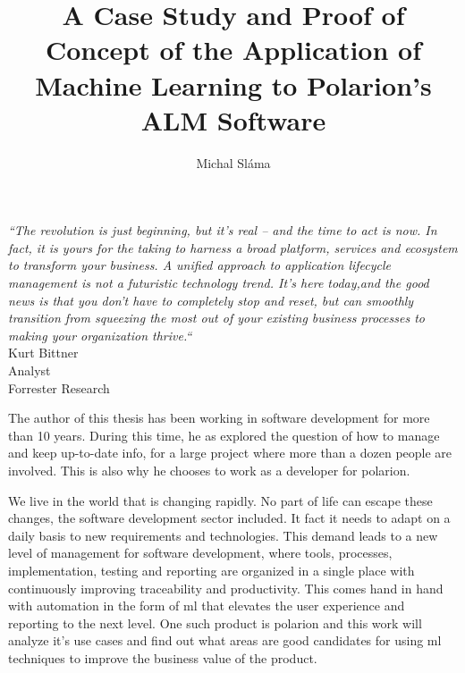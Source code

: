 \documentclass[thesis=M,english]{FITthesis}[2012/06/26]
\title{A Case Study and Proof of Concept of the Application of Machine Learning to Polarion's ALM Software}
\author{Michal Sláma} %
\begin{document}


\todototoc
\listoftodos

\begin{introduction}
	\begin{center}
		\textit{“The revolution is just beginning, but it’s real – and the time to act is now. In fact, it is yours for the taking to harness a broad platform, services and ecosystem to transform your business. A unified approach to application lifecycle management is not a futuristic technology trend. It’s here today,and the good news is that you don’t have to completely stop and reset, but can smoothly transition from squeezing the most out of your existing business processes to making your organization thrive.“}\\
		Kurt Bittner\\
		Analyst\\
		Forrester Research\\
	\end{center}
\end{introduction}

The author of this thesis has been working in software development for more than 10 years. During this time, he as explored the question of how to manage and keep up-to-date info, for a large project where more than a dozen people are involved. This is also why he chooses to work as a developer for \acrshort{polarion}.


We live in the world that is changing rapidly. No part of life can escape these changes, the software development sector included. It fact it needs to adapt on a daily basis to new requirements and technologies. This demand leads to a new level of management for software development, where tools, processes, implementation, testing and reporting are organized in a single place with continuously improving traceability and productivity. This comes hand in hand with automation in the form of \acrshort{ml} that elevates the user experience and reporting to the next level. One such product is \acrshort{polarion}\cite{polarion_alm} and this work will analyze it's use cases and find out what areas are good candidates for using \acrshort{ml} techniques to improve the business value of the product. 
\end{document}
